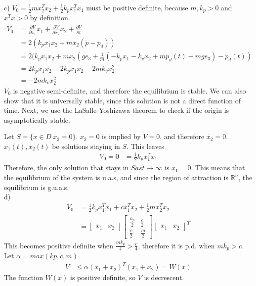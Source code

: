 \documentclass[paper=a4, fontsize=11pt]{scrartcl} %
\numberwithin{equation}{section} %
\numberwithin{figure}{section} %
\numberwithin{table}{section} %
\begin{document}
c) $V_0 = \frac{1}{2}mx_2^Tx_2+\frac{1}{2}k_px_1^Tx_1$ must be positive definite, because $m, k_p >0$ and $x^Tx > 0$ by definition.
\begin{align}
\dot{V_0} &= \frac{\partial V}{\partial x_1}\dot{x_1} + \frac{\partial V}{\partial x_2}\dot{x_2} +\frac{\partial V}{\partial t}\\
&= 2(k_px_1x_2 + mx_2(\ddot{p}-\ddot{p}_d)) \\
&= 2(k_px_1x_2 + mx_2(ge_3+\frac{1}{m}(-k_px_1 - k_vx_2 + m\ddot{p}_d(t)-mge_3 ) - \ddot{p}_d(t)) \\
&= 2k_px_1x_2 - 2k_px_1x_2-2mk_vx_2^2 \\
&= -2mk_vx_2^2
\end{align}
$\dot{V_0}$ is negative semi-definite, and therefore the equilibrium is stable. We can also show that it is universally stable, since this solution is not a direct function of time. Next, we use the LaSalle-Yoshizawa theorem to check if the origin is asymptotically stable. 

Let $S=\{x \in D \ x_2=0\}$. $x_2=0$ is implied by $\dot{V}=0$, and therefore $\dot{x_2}=0$. $x_1(t), x_2(t)$ be solutions staying in $S$. This leaves
\begin{align}
V_0 =0 &= \frac{1}{2}k_px_1^Tx_1
\end{align}
Therefore, the only solution that stays in $S as t\rightarrow \infty$ is $x_1=0$. This means that the equilibrium of the system is u.a.s, and since the region of attraction is $\mathbb{R}^n$, the equilibrium is g.u.a.s.\\

d) \begin{align}
V_0 &= \frac{1}{2}k_px_1^Tx_1+cx_1^Tx_2+\frac{1}{2}mx_2^Tx_2 \\
&= \begin{bmatrix}x_1 & x_2\end{bmatrix} \begin{bmatrix}\frac{k_p}{2} & \frac{c}{2}\\ \frac{c}{2} & \frac{m}{2}\end{bmatrix} \begin{bmatrix}x_1 & x_2\end{bmatrix}^T
\end{align}
This becomes positive definite when $\frac{mk_p}{4} > \frac{c}{4}$, therefore it is p.d. when $mk_p > c$. Let $\alpha=max(kp, c, m)$. 
\begin{align}
V &\leq \alpha(x_1+x_2)^T(x_1+x_2)=W(x)
\end{align}
The function $W(x)$ is positive definite, so $V$ is decrescent. \\
\end{document}
